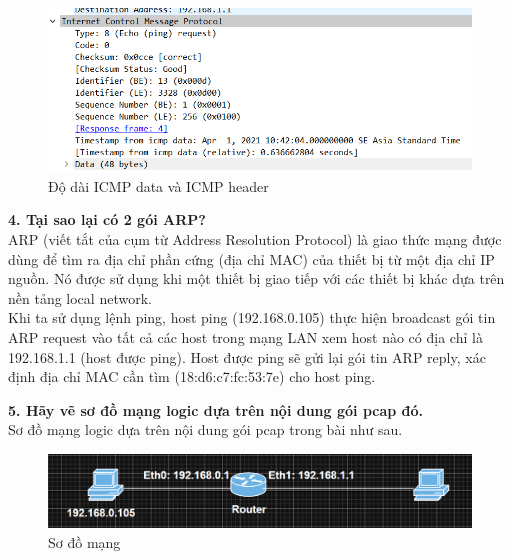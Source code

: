 \begin{figure}[H]
\begin{center}
\includegraphics[scale=1]{../figures/p1/p1_icmp}
\end{center}
\caption{Độ dài ICMP data và ICMP header}
\end{figure}

\textbf{4.	Tại sao lại có 2 gói ARP?}\\
ARP (viết tắt của cụm từ Address Resolution Protocol) là giao thức mạng được dùng để tìm ra địa chỉ phần cứng (địa chỉ MAC) của thiết bị từ một địa chỉ IP nguồn. Nó được sử dụng khi một thiết bị giao tiếp với các thiết bị khác dựa trên nền tảng local network.\\
Khi ta sử dụng lệnh ping, host ping (192.168.0.105) thực hiện broadcast gói tin ARP request vào tất cả các host trong mạng LAN xem host nào có địa chỉ là 192.168.1.1 (host được ping). Host được ping sẽ gửi lại gói tin ARP reply, xác định địa chỉ MAC cần tìm (18:d6:c7:fc:53:7e) cho host ping.

\textbf{5.	Hãy vẽ sơ đồ mạng logic dựa trên nội dung gói pcap đó.} \\
Sơ đồ mạng logic dựa trên nội dung gói pcap trong bài như sau.
\begin{figure}[H]
\begin{center}
\includegraphics[scale=.75]{../figures/p1/p1_lan}
\end{center}
\caption{Sơ đồ mạng}
\end{figure}